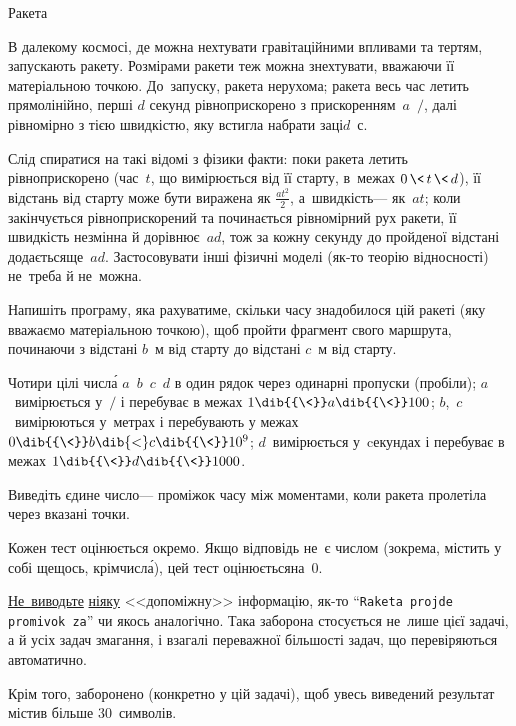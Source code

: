 \begin{problemAllDefault}{Ракета}

В далекому космосі, де можна нехтувати гравітаційними впливами та тертям, запускають ракету. 
Розмірами ракети теж можна знехтувати, вважаючи її матеріальною точкою.
До~запуску, ракета нерухома; ракета весь час летить прямолінійно, перші $d$ секунд рівноприскорено з прискоренням~$a$~\raisebox{2pt}{м}$\!/\!$\raisebox{-2pt}{с$^2$}, далі рівномірно з тією швидкістю, яку встигла набрати за\nolinebreak[3] ці\nolinebreak[3] $d$~с.

Слід спиратися на такі відомі з фізики факти: поки ракета летить рівноприскорено (час~$t$, що вимірюється від її старту, в~межах ${0\,{\<}\,t\,{\<}\,d}$), її відстань від старту може бути виражена як $\frac{at^2}{2}$, а~швидкість\nolinebreak[3] --- як~$at$;
коли закінчується рівноприскорений та починається рівномірний рух ракети, її швидкість незмінна й дорівнює~$ad$, тож за кожну секунду до пройденої відстані додається\nolinebreak[3] ще~$ad$.
Застосовувати інші фізичні моделі (як-то теорію відносності) не~треба й не~можна.

Напишіть програму, яка рахуватиме, скільки часу знадобилося цій ракеті (яку вважаємо матеріальною точкою), щоб пройти фрагмент свого маршрута, починаючи з відстані $b$~м від старту до відстані $c$~м від старту.

\InputFile
Чотири цілі числ\'{а} $a$~$b$~$c$~$d$ в один рядок через одинарні пропуски (пробіли);
$a$~вимірюється у~\raisebox{2pt}{м}$\!/\!$\raisebox{-2pt}{с$^2$} і перебуває в межах $1\dib{{\<}}a\dib{{\<}}100$;
$b$,~$c$~вимірюються у~метрах і перебувають у межах $0\dib{{\<}}b\dib{{<}}c\dib{{\<}}10^9$;
$d$~вимірюється у~cекундах і перебуває в межах $1\dib{{\<}}d\dib{{\<}}1000$.

\OutputFile
Виведіть єдине число\nolinebreak[3] --- проміжок часу між моментами, коли ракета пролетіла через вказані точки. 

\Scoring
Кожен тест оцінюється окремо.
Якщо відповідь не~є числом (зокрема, містить у собі ще\nolinebreak[3] щось, крім\nolinebreak[2] числ\'{а}), цей тест оцінюється\nolinebreak[2] на~0. \begin{itshape}\underline{Не~виводьте} \underline{ніяку} <<допоміжну>> інформацію, як-то ``\texttt{Raketa projde promivok za}'' чи якось аналогічно. Така заборона стосується не~лише цієї задачі, а й усіх задач змагання, і взагалі переважної більшості задач, що перевіряються автоматично.\end{itshape}
Крім того, заборонено (конкретно у цій задачі), щоб увесь виведений результат містив більше 30~символів.


\end{problemAllDefault}
